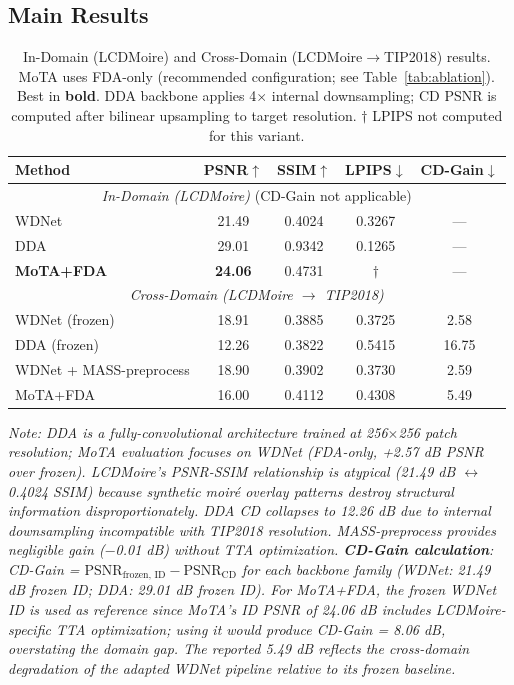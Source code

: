 \documentclass[review,10pt]{elsarticle}
\begin{document}
\subsection{Main Results}

\begin{table}[tb]
\centering
\footnotesize
\caption{In-Domain (LCDMoire) and Cross-Domain (LCDMoire$\to$TIP2018) results. MoTA uses FDA-only (recommended configuration; see Table~\ref{tab:ablation}). Best in \textbf{bold}. DDA backbone applies 4$\times$ internal downsampling; CD PSNR is computed after bilinear upsampling to target resolution. $\dagger$ LPIPS not computed for this variant.}
\label{tab:main_results}
\setlength{\tabcolsep}{2.5pt}
\begin{tabular}{@{}lcccc@{}}
\toprule
Method & PSNR$\uparrow$ & SSIM$\uparrow$ & LPIPS$\downarrow$ & CD-Gain$\downarrow$ \\
\midrule
\multicolumn{5}{c}{\textit{In-Domain (LCDMoire)} \hfill (CD-Gain not applicable)} \\
\midrule
WDNet \cite{liu2020wavelet} & 21.49 & 0.4024 & 0.3267 & --- \\
DDA \cite{zhang2023dda} & 29.01 & 0.9342 & 0.1265 & --- \\
\textbf{MoTA+FDA} & \textbf{24.06} & 0.4731 & $\dagger$ & --- \\
\midrule
\multicolumn{5}{c}{\textit{Cross-Domain (LCDMoire $\to$ TIP2018)}} \\
\midrule
WDNet (frozen) & 18.91 & 0.3885 & 0.3725 & 2.58 \\
DDA (frozen) & 12.26 & 0.3822 & 0.5415 & 16.75 \\
WDNet + MASS-preprocess & 18.90 & 0.3902 & 0.3730 & 2.59 \\
MoTA+FDA & 16.00 & 0.4112 & 0.4308 & 5.49 \\
\bottomrule
\end{tabular}
\end{table}

{\raggedright\small\textit{Note: DDA is a fully-convolutional architecture trained at 256$\times$256 patch resolution; MoTA evaluation focuses on WDNet (FDA-only, +2.57 dB PSNR over frozen). LCDMoire's PSNR-SSIM relationship is atypical (21.49 dB $\leftrightarrow$ 0.4024 SSIM) because synthetic moir\'{e} overlay patterns destroy structural information disproportionately. DDA CD collapses to 12.26 dB due to internal downsampling incompatible with TIP2018 resolution. MASS-preprocess provides negligible gain ($-$0.01 dB) without TTA optimization. \textbf{CD-Gain calculation}: CD-Gain = $\text{PSNR}_{\text{frozen, ID}} - \text{PSNR}_{\text{CD}}$ for each backbone family (WDNet: 21.49 dB frozen ID; DDA: 29.01 dB frozen ID). For MoTA+FDA, the frozen WDNet ID is used as reference since MoTA's ID PSNR of 24.06 dB includes LCDMoire-specific TTA optimization; using it would produce CD-Gain = 8.06 dB, overstating the domain gap. The reported 5.49 dB reflects the cross-domain degradation of the adapted WDNet pipeline relative to its frozen baseline.}}
\end{document}
